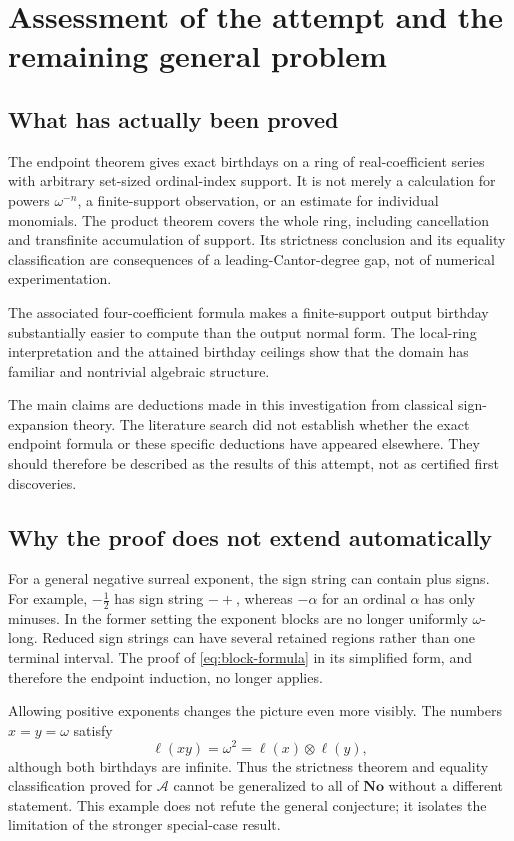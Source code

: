 \documentclass[11pt,letterpaper]{article}
\theoremstyle{definition}
\theoremstyle{remark}
\newcommand{\No}{\mathbf{No}}
\newcommand{\A}{\mathscr{A}}
\newcommand{\bd}{\ell}
\newcommand{\np}{\mathbin{\otimes}}
\begin{document}
\section{Assessment of the attempt and the remaining general problem}

\subsection{What has actually been proved}
The endpoint theorem gives exact birthdays on a ring of real-coefficient
series with arbitrary set-sized ordinal-index support. It is not merely a
calculation for powers \(\omega^{-n}\), a finite-support observation, or
an estimate for individual monomials. The product theorem covers the
whole ring, including cancellation and transfinite accumulation of support.
Its strictness conclusion and its equality classification are consequences
of a leading-Cantor-degree gap, not of numerical experimentation.

The associated four-coefficient formula makes a finite-support output
birthday substantially easier to compute than the output normal form.
The local-ring interpretation and the attained birthday ceilings show
that the domain has familiar and nontrivial algebraic structure.

The main claims are deductions made in this investigation from classical
sign-expansion theory. The literature search did not establish whether
the exact endpoint formula or these specific deductions have appeared
elsewhere. They should therefore be described as the results of this
attempt, not as certified first discoveries.

\subsection{Why the proof does not extend automatically}
For a general negative surreal exponent, the sign string can contain plus
signs. For example, \(-\tfrac12\) has sign string \(-+\), whereas
\(-\alpha\) for an ordinal \(\alpha\) has only minuses. In the former
setting the exponent blocks are no longer uniformly \(\omega\)-long.
Reduced sign strings can have several retained regions rather than one
terminal interval. The proof of \eqref{eq:block-formula} in its simplified
form, and therefore the endpoint induction, no longer applies.

Allowing positive exponents changes the picture even more visibly.
The numbers \(x=y=\omega\) satisfy
\[
 \bd(xy)=\omega^2=\bd(x)\np\bd(y),
\]
although both birthdays are infinite. Thus the strictness theorem and
equality classification proved for \(\A\) cannot be generalized to all
of \(\No\) without a different statement. This example does not refute
the general conjecture; it isolates the limitation of the stronger
special-case result.
\end{document}
